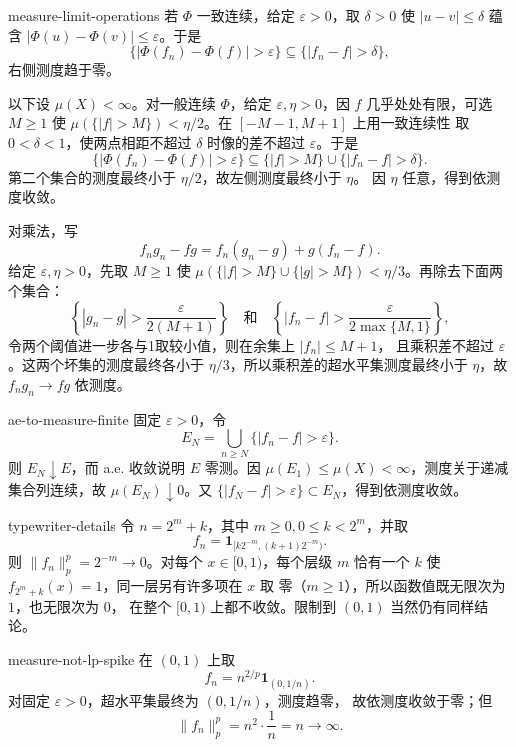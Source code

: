 \begin{solution}{measure-limit-operations}
若 \(\Phi\) 一致连续，给定 \(\varepsilon>0\)，取 \(\delta>0\) 使
\(|u-v|\le\delta\) 蕴含
\(|\Phi(u)-\Phi(v)|\le\varepsilon\)。于是
\[
 \{|\Phi(f_n)-\Phi(f)|>\varepsilon\}
 \subseteq\{|f_n-f|>\delta\},
\]
右侧测度趋于零。

以下设 \(\mu(X)<\infty\)。对一般连续 \(\Phi\)，给定
\(\varepsilon,\eta>0\)，因 \(f\) 几乎处处有限，可选 \(M\ge1\)
使 \(\mu(\{|f|>M\})<\eta/2\)。在 \([-M-1,M+1]\) 上用一致连续性
取 \(0<\delta<1\)，使两点相距不超过 \(\delta\) 时像的差不超过
\(\varepsilon\)。于是
\[
 \{|\Phi(f_n)-\Phi(f)|>\varepsilon\}
 \subseteq\{|f|>M\}\cup\{|f_n-f|>\delta\}.
\]
第二个集合的测度最终小于 \(\eta/2\)，故左侧测度最终小于 \(\eta\)。
因 \(\eta\) 任意，得到依测度收敛。

对乘法，写
\[
 f_ng_n-fg=f_n(g_n-g)+g(f_n-f).
\]
给定 \(\varepsilon,\eta>0\)，先取 \(M\ge1\) 使
\(\mu(\{|f|>M\}\cup\{|g|>M\})<\eta/3\)。再除去下面两个集合：
\[
 \left\{|g_n-g|>\frac{\varepsilon}{2(M+1)}\right\}
 \quad\text{和}\quad
 \left\{|f_n-f|>\frac{\varepsilon}{2\max\{M,1\}}\right\},
\]
令两个阈值进一步各与1取较小值，则在余集上 \(|f_n|\le M+1\)，
且乘积差不超过 \(\varepsilon\)。这两个坏集的测度最终各小于
\(\eta/3\)，所以乘积差的超水平集测度最终小于 \(\eta\)，故
\(f_ng_n\to fg\) 依测度。
\end{solution}

\begin{solution}{ae-to-measure-finite}
固定 \(\varepsilon>0\)，令
\[
 E_N=\bigcup_{n\ge N}\{|f_n-f|>\varepsilon\}.
\]
则 \(E_N\downarrow E\)，而 a.e. 收敛说明 \(E\) 零测。因
\(\mu(E_1)\le\mu(X)<\infty\)，测度关于递减集合列连续，故
\(\mu(E_N)\downarrow0\)。又
\(\{|f_N-f|>\varepsilon\}\subset E_N\)，得到依测度收敛。
\end{solution}

\begin{solution}{typewriter-details}
令 \(n=2^m+k\)，其中 \(m\ge0,0\le k<2^m\)，并取
\[
 f_n=\mathbf1_{[k2^{-m},(k+1)2^{-m})}.
\]
则 \(\|f_n\|_p^p=2^{-m}\to0\)。对每个 \(x\in[0,1)\)，每个层级 \(m\)
恰有一个 \(k\) 使 \(f_{2^m+k}(x)=1\)，同一层另有许多项在 \(x\) 取
零（\(m\ge1\)），所以函数值既无限次为 \(1\)，也无限次为 \(0\)，
在整个 \([0,1)\) 上都不收敛。限制到 \((0,1)\) 当然仍有同样结论。
\end{solution}

\begin{solution}{measure-not-lp-spike}
在 \((0,1)\) 上取
\[
 f_n=n^{2/p}\mathbf1_{(0,1/n)}.
\]
对固定 \(\varepsilon>0\)，超水平集最终为 \((0,1/n)\)，测度趋零，
故依测度收敛于零；但
\[
 \|f_n\|_p^p=n^2\cdot\frac1n=n\to\infty.
\]
\end{solution}

